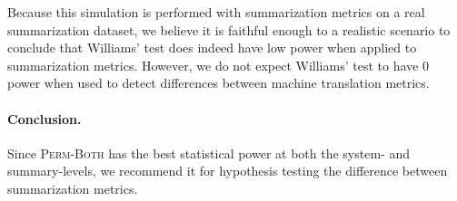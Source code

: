 Because this simulation is performed with summarization metrics on a real summarization dataset, we believe it is faithful enough to a realistic scenario to conclude that Williams' test does indeed have low power when applied to summarization metrics.
However, we do not expect Williams' test to have 0 power when used to detect differences between machine translation metrics.

\paragraph{Conclusion.}
Since \textsc{Perm-Both} has the best statistical power at both the system- and summary-levels, we recommend it for hypothesis testing the difference between summarization metrics.